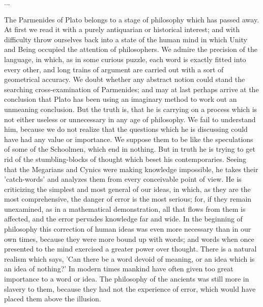 \documentclass[11pt,letter]{article}
\begin{document}
\par  ...

\par  The Parmenides of Plato belongs to a stage of philosophy which has passed away. At first we read it with a purely antiquarian or historical interest; and with difficulty throw ourselves back into a state of the human mind in which Unity and Being occupied the attention of philosophers. We admire the precision of the language, in which, as in some curious puzzle, each word is exactly fitted into every other, and long trains of argument are carried out with a sort of geometrical accuracy. We doubt whether any abstract notion could stand the searching cross-examination of Parmenides; and may at last perhaps arrive at the conclusion that Plato has been using an imaginary method to work out an unmeaning conclusion. But the truth is, that he is carrying on a process which is not either useless or unnecessary in any age of philosophy. We fail to understand him, because we do not realize that the questions which he is discussing could have had any value or importance. We suppose them to be like the speculations of some of the Schoolmen, which end in nothing. But in truth he is trying to get rid of the stumbling-blocks of thought which beset his contemporaries. Seeing that the Megarians and Cynics were making knowledge impossible, he takes their 'catch-words' and analyzes them from every conceivable point of view. He is criticizing the simplest and most general of our ideas, in which, as they are the most comprehensive, the danger of error is the most serious; for, if they remain unexamined, as in a mathematical demonstration, all that flows from them is affected, and the error pervades knowledge far and wide. In the beginning of philosophy this correction of human ideas was even more necessary than in our own times, because they were more bound up with words; and words when once presented to the mind exercised a greater power over thought. There is a natural realism which says, 'Can there be a word devoid of meaning, or an idea which is an idea of nothing?' In modern times mankind have often given too great importance to a word or idea. The philosophy of the ancients was still more in slavery to them, because they had not the experience of error, which would have placed them above the illusion.
\end{document}
